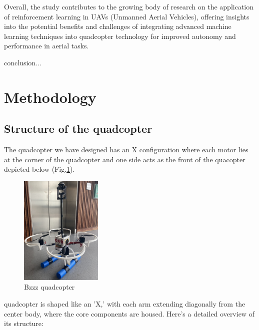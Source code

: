 \documentclass{article}
\begin{document}
Overall, the study contributes to the growing body of research on the application of reinforcement learning in UAVs (Unmanned Aerial Vehicles), offering insights into the potential benefits and challenges of integrating advanced machine learning techniques into quadcopter technology for improved autonomy and performance in aerial tasks.

conclusion...
\section{Methodology}
\subsection{Structure of the quadcopter}
The quadcopter we have designed has an X configuration where each motor lies at the corner of the quadcopter and one side acts as the front of the quacopter depicted below (Fig.\ref{fig:QuadDiagram}). 

\begin{figure}[h] %
  \centering
  \includegraphics[width=0.35\textwidth]{Pictures/Quad.jpg} 
  \caption{Bzzz quadcopter}
  \label{fig:QuadDiagram}
\end{figure}

quadcopter is shaped like an 'X,' with each arm extending diagonally from the center body, where the core components are housed. Here's a detailed overview of its structure:
\end{document}
